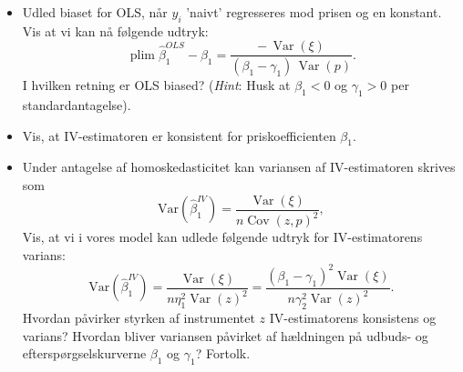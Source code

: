 \documentclass[a4paper,12pt]{article}
\begin{document}
\begin{itemize}
    \item Udled biaset for OLS, når \(y_i\) 'naivt' regresseres mod prisen og en konstant. Vis at vi kan nå følgende udtryk:
    \[
 \operatorname{plim} \hat \beta^{OLS}_1 - \beta_1 =  \frac{-\,\operatorname{Var}(\xi)}{(\beta_1-\gamma_1)\,\operatorname{Var}(p)}.
\]
I hvilken retning er OLS biased? (\textit{Hint}: Husk at $\beta_1<0$ og $\gamma_1>0$ per standardantagelse). 
    \item Vis, at IV-estimatoren er konsistent for priskoefficienten \(\beta_1\).  
    \item Under antagelse af homoskedasticitet kan variansen af IV-estimatoren skrives som
\[
\text{Var}\left(\hat{\beta}^{IV}_1\right) = \frac{\operatorname{Var}{(\xi)}}{n\operatorname{Cov}(z, p)^2},
\] 
Vis, at vi i vores model kan udlede følgende udtryk for IV-estimatorens varians:
\[
\text{Var}\left(\hat{\beta}^{IV}_1\right) = \frac{\operatorname{Var}(\xi)}{n\eta_1^2 \operatorname{Var}(z)^2} = \frac{(\beta_1-\gamma_1)^2 \operatorname{Var}(\xi)}{n \gamma_2^2 \operatorname{Var}(z)^2}.
\]
Hvordan påvirker styrken af instrumentet \(z\) IV-estimatorens konsistens og varians? Hvordan bliver variansen påvirket af hældningen på udbuds- og efterspørgselskurverne  $\beta_1$ og $\gamma_1$? Fortolk.
\end{itemize}
\hrulefill
\end{document}
